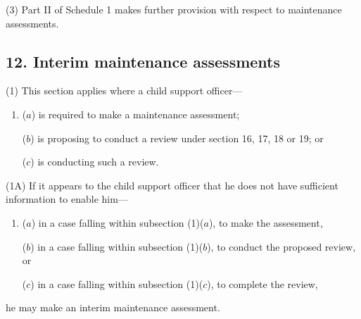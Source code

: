 \documentclass[12pt,a4paper]{article}
\begin{document}
(3) Part II of Schedule 1 makes further provision with respect to maintenance assessments.


\subsection{12. Interim maintenance assessments}


(1) This section applies where a child support officer—
\begin{enumerate}\item[]
($a$) is required to make a maintenance assessment;

($b$) is proposing to conduct a review under section 16, 17, 18 or 19; or

($c$) is conducting such a review.
\end{enumerate}

(1A) If it appears to the child support officer that he does not have sufficient information to enable him—
\begin{enumerate}\item[]
($a$) in a case falling within subsection (1)($a$), to make the assessment,

($b$) in a case falling within subsection (1)($b$), to conduct the proposed review, or

($c$) in a case falling within subsection (1)($c$), to complete the review,
\end{enumerate}
he may make an interim maintenance assessment.

%
\end{document}
